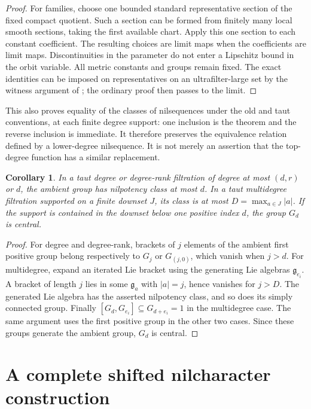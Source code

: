 \documentclass[11pt]{article}
\newtheorem{corollary}[theorem]{Corollary}
\begin{document}
\begin{proof}
For families, choose one bounded standard representative section of the
fixed compact quotient. Such a section can be formed from finitely many
local smooth sections, taking the first available chart. Apply this one
section to each constant coefficient. The resulting choices are limit maps
when the coefficients are limit maps. Discontinuities in the parameter do
not enter a Lipschitz bound in the orbit variable. All metric constants and
groups remain fixed. The exact identities can be imposed on representatives
on an ultrafilter-large set by the witness argument of
\cite[Section 7]{LP13}; the ordinary proof then passes to the limit.
\end{proof}

This also proves equality of the classes of nilsequences under the old and
taut conventions, at each finite degree support: one inclusion is the theorem
and the reverse inclusion is immediate. It therefore preserves the
equivalence relation defined by a lower-degree nilsequence. It is not merely
an assertion that the top-degree function has a similar replacement.

\begin{corollary}\label{cor:central}
In a taut degree or degree-rank filtration of degree at most $(d,r)$ or $d$,
the ambient group has nilpotency class at most $d$. In a taut multidegree
filtration supported on a finite downset $J$, its class is at most
$D=\max_{a\in J}|a|$. If the support is contained in the downset below one
positive index $d$, the group $G_d$ is central.
\end{corollary}
\begin{proof}
For degree and degree-rank, brackets of $j$ elements of the ambient first
positive group belong respectively to $G_j$ or $G_{(j,0)}$, which vanish
when $j>d$. For multidegree, expand an iterated Lie bracket using the
generating Lie algebras $\mathfrak g_{e_i}$. A bracket of length $j$ lies in
some $\mathfrak g_a$ with $|a|=j$, hence vanishes for $j>D$.
The generated Lie algebra has the asserted nilpotency class, and so does
its simply connected group. Finally $[G_d,G_{e_i}]\subseteq G_{d+e_i}=1$
in the multidegree case. The same argument uses the first positive group
in the other two cases. Since these groups generate the ambient group,
$G_d$ is central.
\end{proof}

\section{A complete shifted nilcharacter construction}
\end{document}
